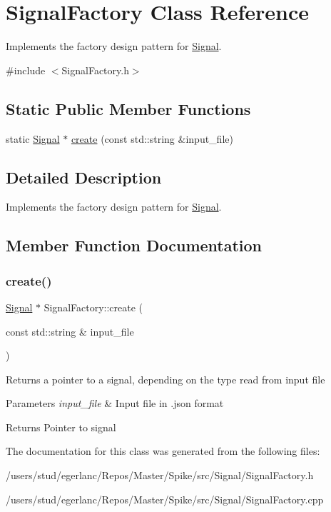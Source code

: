 \hypertarget{classSignalFactory}{}\section{Signal\+Factory Class Reference}
\label{classSignalFactory}


Implements the factory design pattern for \hyperlink{classSignal}{Signal}.  




{\ttfamily \#include $<$Signal\+Factory.\+h$>$}

\subsection*{Static Public Member Functions}
\begin{DoxyCompactItemize}
\item 
static \hyperlink{classSignal}{Signal} $\ast$ \hyperlink{classSignalFactory_ae06369d1d5aa9e672b1395ddfa75ed07}{create} (const std\+::string \&input\+\_\+file)
\end{DoxyCompactItemize}


\subsection{Detailed Description}
Implements the factory design pattern for \hyperlink{classSignal}{Signal}. 

\subsection{Member Function Documentation}
\mbox{\label{classSignalFactory_ae06369d1d5aa9e672b1395ddfa75ed07}} 
\subsubsection{\texorpdfstring{create()}{create()}}
{\footnotesize\ttfamily \hyperlink{classSignal}{Signal} $\ast$ Signal\+Factory\+::create (\begin{DoxyParamCaption}\item[{const std\+::string \&}]{input\+\_\+file }\end{DoxyParamCaption})\hspace{0.3cm}{\ttfamily [static]}}

Returns a pointer to a signal, depending on the type read from input file 
\begin{DoxyParams}{Parameters}
{\em input\+\_\+file} & Input file in .json format \\
\hline
\end{DoxyParams}
\begin{DoxyReturn}{Returns}
Pointer to signal 
\end{DoxyReturn}


The documentation for this class was generated from the following files\+:\begin{DoxyCompactItemize}
\item 
/users/stud/egerlanc/\+Repos/\+Master/\+Spike/src/\+Signal/Signal\+Factory.\+h\item 
/users/stud/egerlanc/\+Repos/\+Master/\+Spike/src/\+Signal/Signal\+Factory.\+cpp\end{DoxyCompactItemize}
